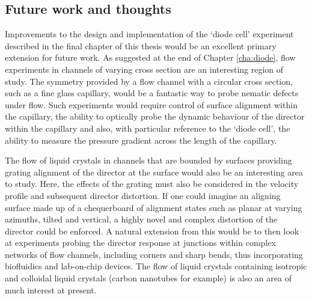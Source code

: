 \subsection{Future work and thoughts}
Improvements to the design and implementation of the `diode cell' experiment described in the final chapter of this thesis would be an excellent primary extension for future work. As suggested at the end of Chapter \ref{cha:diode}, flow experiments in channels of varying cross section are an interesting region of study. The symmetry provided by a flow channel with a circular cross section, such as a fine glass capillary, would be a fantastic way to probe nematic defects under flow. Such experiments would require control of surface alignment within the capillary, the ability to optically probe the dynamic behaviour of the director within the capillary and also, with particular reference to the `diode cell', the ability to measure the pressure gradient across the length of the capillary.

The flow of liquid crystals in channels that are bounded by surfaces providing grating alignment of the director at the surface would also be an interesting area to study. Here, the effects of the grating must also be considered in the velocity profile and subsequent director distortion. If one could imagine an aligning surface made up of a chequerboard of alignment states such as planar at varying azimuths, tilted and vertical, a highly novel and complex distortion of the director could be enforced. A natural extension from this would be to then look at experiments probing the director response at junctions within complex networks of flow channels, including corners and sharp bends, thus incorporating biofluidics and lab-on-chip devices. The flow of liquid crystals containing isotropic and colloidal liquid crystals (carbon nanotubes for example) is also an area of much interest at present. 

